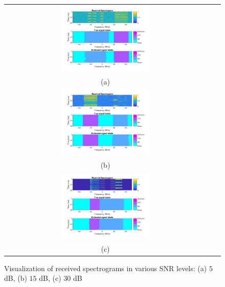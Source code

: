 \documentclass[journal]{IEEEtran} %
\begin{document}
\begin{figure}[!ht]
    \centering
    \footnotesize
    \begin{tabular}{ccc}
        \includegraphics[width=0.45\textwidth]{img/Visualization_5dB.jpg} \\ (a)\\  \includegraphics[width=0.45\textwidth]{img/Visualization_15dB.jpg} \\ (b)\\ 
        \includegraphics[width=0.45\textwidth]{img/Visualization_30dB.jpg} \\ (c)\\ 
    \end{tabular}
    \caption{Visualization of received spectrograms in various SNR levels: (a) $5$ dB, (b) $15$ dB, (c) $30$ dB}
    \label{fig7}
\end{figure}
\end{document}
